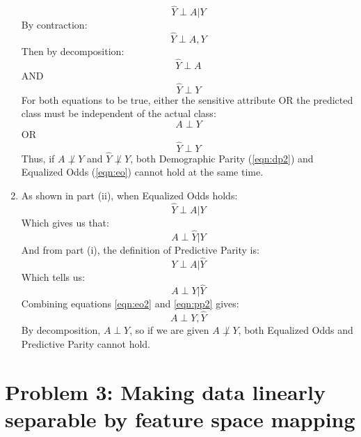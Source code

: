\documentclass[twoside,11pt]{homework}
\DeclarePairedDelimiter{\2norm}{\lVert}{\rVert^2_2}
\newcommand{\1}[1]{\mathds{1}\left[#1\right]}
\begin{document}
\begin{enumerate}[\bf (i)]
\begin{equation}
	\label{eqn:eo}
	\hat{Y} \perp A | Y
	\end{equation}
	By contraction:
	\begin{equation}
	\hat{Y} \perp A,Y
	\end{equation}
	Then by decomposition:
	\begin{equation}
	\hat{Y} \perp A
	\end{equation}
	AND
	\begin{equation}
	\hat{Y} \perp Y
	\end{equation}
	For both equations to be true, either the sensitive attribute OR the predicted class must be independent of the actual class:
	\begin{equation}
	A\perp Y
	\end{equation}
	OR
	\begin{equation}
	\hat{Y}\perp Y
	\end{equation}
	Thus, if $A\not\perp Y$ and $\hat{Y}\not\perp Y$, both Demographic Parity (\ref{eqn:dp2}) and Equalized Odds (\ref{eqn:eo}) cannot hold at the same time.
	\item As shown in part (ii), when Equalized Odds holds:
	\begin{equation}
	\hat{Y} \perp A|Y
	\end{equation}
	Which gives us that:
	\begin{equation}
	\label{eqn:eo2}
	A\perp \hat{Y}|Y
	\end{equation}
	And from part (i), the definition of Predictive Parity is:
	\begin{equation}
	Y\perp A|\hat{Y}
	\end{equation}
	Which tells us:
	\begin{equation}
	\label{eqn:pp2}
	A\perp Y|\hat{Y}
	\end{equation}
	Combining equations \ref{eqn:eo2} and \ref{eqn:pp2} gives:
	\begin{equation}
	A\perp Y,\hat{Y}
	\end{equation}
	By decomposition, $A \perp Y$, so if we are given $A \not\perp Y$, both Equalized Odds and Predictive Parity cannot hold.
\end{enumerate}


\section*{Problem 3: Making data linearly separable by feature space mapping}
\end{document}
